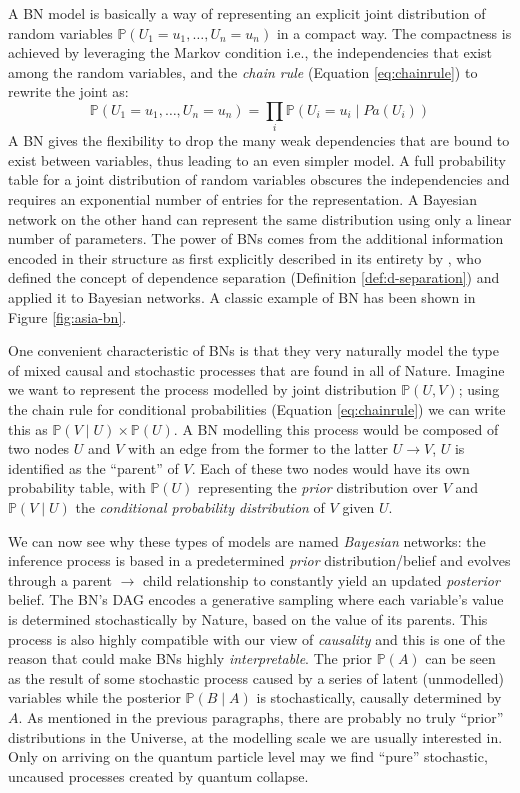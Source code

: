 A BN model is basically a way of representing an explicit joint distribution of random variables $\mathbb{P}(U_1=u_1, \ldots ,U_n=u_n) $ in a compact way.
The compactness is achieved by leveraging the Markov condition i.e., the independencies that exist among the random variables, and the \textit{chain rule} (Equation \ref{eq:chainrule}) to rewrite the joint as:
\begin{equation}
	\mathbb{P}(U_1=u_1, \ldots ,U_n=u_n) = \prod_i \mathbb{P}(U_i=u_i \mid Pa(U_i))
\end{equation} 
A BN gives the flexibility to drop the many weak dependencies that are bound to exist between variables, thus leading to an even simpler model.
A full probability table for a joint distribution of random variables obscures the independencies and requires an exponential number of entries for the representation.
A Bayesian network on the other hand can represent the same distribution using only a linear number of parameters.
The power of BNs comes from the additional information encoded in their structure as first explicitly described in its entirety by \citet{Pearl1988}, who defined the concept of dependence separation (Definition \ref{def:d-separation}) and applied it to Bayesian networks.
A classic example of BN has been shown in Figure \ref{fig:asia-bn}.

One convenient characteristic of BNs is that they very naturally model the type of mixed causal and stochastic processes that are found in all of Nature.
Imagine we want to represent the process modelled by joint distribution $\mathbb{P}(U,V)$; using the chain rule for conditional probabilities (Equation \ref{eq:chainrule}) we can write this as $\mathbb{P}(V \mid U) \times \mathbb{P}(U)$.
A BN modelling this process would be composed of two nodes $U$ and $V$ with an edge from the former to the latter $U \rightarrow V$, $U$ is identified as the \enquote{parent} of $V$. 
Each of these two nodes would have its own probability table, with $\mathbb{P}(U)$ representing the \textit{prior} distribution over $V$ and $\mathbb{P}(V \mid U)$ the \textit{conditional probability distribution} of $V$ given $U$.

We can now see why these types of models are named \textit{Bayesian} networks: the inference process is based in a predetermined \textit{prior} distribution/belief and evolves through a parent $\rightarrow$ child relationship to constantly yield an updated \textit{posterior} belief.
The BN's DAG encodes a generative sampling where each variable's value is determined stochastically by Nature, based on the value of its parents.
This process is also highly compatible with our view of \textit{causality} and this is one of the reason that could make BNs highly \textit{interpretable}.
The prior $\mathbb{P}(A)$ can be seen as the result of some stochastic process caused by a series of latent (unmodelled) variables while the posterior $\mathbb{P}(B \mid A)$ is stochastically, causally determined by $A$. 
As mentioned in the previous paragraphs, there are probably no truly \enquote{prior} distributions in the Universe, at the modelling scale we are usually interested in.
Only on arriving on the quantum particle level may we find \enquote{pure} stochastic, uncaused processes created by quantum collapse.

